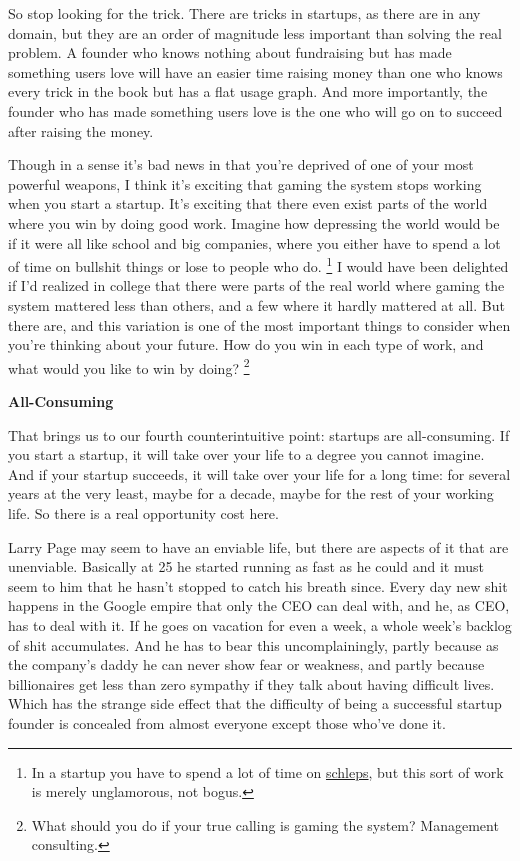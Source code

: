 \documentclass[12pt]{book}
\begin{document}
So stop looking for the trick. There are tricks in startups, as there
are in any domain, but they are an order of magnitude less important
than solving the real problem. A founder who knows nothing about
fundraising but has made something users love will have an easier time
raising money than one who knows every trick in the book but has a flat
usage graph. And more importantly, the founder who has made something
users love is the one who will go on to succeed after raising the money.

Though in a sense it's bad news in that you're deprived of one of your
most powerful weapons, I think it's exciting that gaming the system
stops working when you start a startup. It's exciting that there even
exist parts of the world where you win by doing good work. Imagine how
depressing the world would be if it were all like school and big
companies, where you either have to spend a lot of time on bullshit
things or lose to people who do. \footnote{In a startup you have to spend a lot of time on
\href{schlep.html}{schleps}, but this sort of work is merely
unglamorous, not bogus.} I would have
been delighted if I'd realized in college that there were parts of the
real world where gaming the system mattered less than others, and a few
where it hardly mattered at all. But there are, and this variation is
one of the most important things to consider when you're thinking about
your future. How do you win in each type of work, and what would you
like to win by doing? \footnote{What should you do if your true calling is gaming the system?
Management consulting.}

\textbf{All-Consuming}

That brings us to our fourth counterintuitive point: startups are
all-consuming. If you start a startup, it will take over your life to a
degree you cannot imagine. And if your startup succeeds, it will take
over your life for a long time: for several years at the very least,
maybe for a decade, maybe for the rest of your working life. So there is
a real opportunity cost here.

Larry Page may seem to have an enviable life, but there are aspects of
it that are unenviable. Basically at 25 he started running as fast as he
could and it must seem to him that he hasn't stopped to catch his breath
since. Every day new shit happens in the Google empire that only the CEO
can deal with, and he, as CEO, has to deal with it. If he goes on
vacation for even a week, a whole week's backlog of shit accumulates.
And he has to bear this uncomplainingly, partly because as the company's
daddy he can never show fear or weakness, and partly because
billionaires get less than zero sympathy if they talk about having
difficult lives. Which has the strange side effect that the difficulty
of being a successful startup founder is concealed from almost everyone
except those who've done it.
\end{document}
